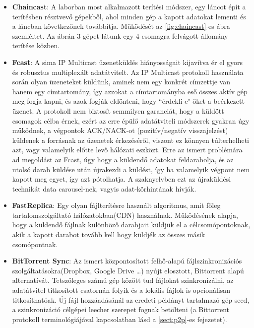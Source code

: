 \begin{itemize}
  \item \textbf{Chaincast}: A laborban most alkalmazott terítési módszer, egy láncot épít a terítésben résztvevő gépekből, ahol minden gép a kapott adatokat lementi és a láncban következőnek továbbítja. Működését az \ref{fig:chaincast}-es ábra szemléltet. Az ábrán 3 gépet látunk egy 4 csomagra felvágott állomány terítése közben.
  \item \textbf{Fcast}\cite{gemmell2000fcast}: A sima IP Multicast üzenetküldés hiányosságait kijavítva ér el gyors és robusztus multiplexált adatátvitelt. Az IP Multicast protokoll használata során olyan üzeneteket küldünk, aminek nem egy konkrét címzettje van hanem egy címtartomány, így azzokat a címtartományba eső összes aktív gép meg fogja kapni, és azok fogják eldönteni, hogy ``érdekli-e" őket a beérkezett üzenet. A protokoll nem biztosít semmilyen garanciát, hogy a küldött csomagok célba érnek, ezért az erre épülő adatátviteli módszerek gyakran úgy működnek, a végpontok ACK/NACK-ot (pozitív/negatív visszajelzést) küldenek a forrásnak az üzenetek érkezéséről, viszont ez könnyen túlterhelheti azt, vagy valamelyik előtte levő hálózati eszközt. Erre az ismert problémára ad megoldást az Fcast, úgy hogy a küldendő adatokat feldarabolja, és az utolsó darab küldése után újrakezdi a küldést, így ha valamelyik végpont nem kapott meg egyet, így azt pótolhatja. A szaknyelvben ezt az újraküldési technikát data carousel-nek, vagyis adat-körhintának hívják.
  \item \textbf{FastReplica}\cite{cherkasova2003fastreplica}:  Egy olyan fájlterítésre használt algoritmus, amit főleg tartalomszolgáltató hálózatokban(CDN) használnak. Működésének alapja, hogy a küldendő fájlnak különböző darabjait küldjük el a célcsomópontoknak, akik a kapott darabot tovább kell hogy küldjék az összes másik csomópontnak.
  \item \textbf{BitTorrent Sync}\cite{farina2014bittorrent}: Az ismert központosított felhő-alapú fájlszinkronizációs szolgáltatásokra(Dropbox, Google Drive \ldots) nyújt elosztott, Bittorrent alapú alternatívát. Tetszőleges számú gép között tud fájlokat szinkronizálni, az adatátvitel titkosított csatornán folyik és a lokális fájlok is opcionálisan titkosíthatóak. Új fájl hozzáadásánál az eredeti példányt tartalmazó gép seed, a szinkronizáció célgépei leecher szerepet fognak betölteni (a Bittorrent protokoll terminológiájával kapcsolatban lásd a \ref{sect:p2p}-es fejezetet).
\end{itemize}

